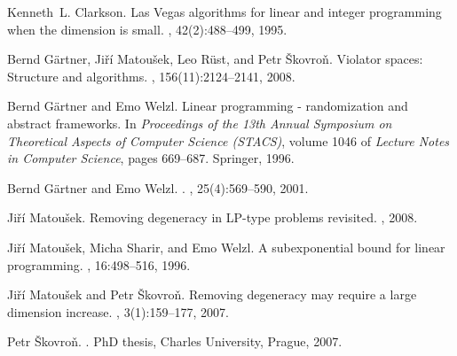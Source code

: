 \documentclass[12pt]{article}
\theoremstyle{remark}
\begin{document}
\newpage

\begin{thebibliography}{1}

Kenneth~L. Clarkson.
\newblock Las {V}egas algorithms for linear and integer programming when the
  dimension is small.
, 42(2):488--499, 1995.

Bernd G{\"a}rtner, Ji{\v{r}}{\'{i}} Matou{\v{s}}ek, Leo R{\"u}st, and Petr
  {\v{S}}kovro{\v{n}}.
\newblock Violator spaces: Structure and algorithms.
, 156(11):2124--2141, 2008.

Bernd G{\"a}rtner and Emo Welzl.
\newblock Linear programming - randomization and abstract frameworks.
\newblock In {\em Proceedings of the 13th Annual Symposium on Theoretical
  Aspects of Computer Science ({STACS})}, volume 1046 of {\em Lecture Notes in
  Computer Science}, pages 669--687. Springer, 1996.

Bernd G{\"a}rtner and Emo Welzl.
.
, 25(4):569--590, 2001.

Ji{\v{r}}{\'{i}} Matou{\v{s}}ek.
\newblock Removing degeneracy in {LP}-type problems revisited.
, 2008.

Ji{\v{r}}{\'{i}} Matou{\v{s}}ek, Micha Sharir, and Emo Welzl.
\newblock A subexponential bound for linear programming.
, 16:498--516, 1996.

Ji{\v{r}}{\'{i}} Matou{\v{s}}ek and Petr {\v{S}}kovro{\v{n}}.
\newblock Removing degeneracy may require a large dimension increase.
, 3(1):159--177, 2007.

Petr {\v{S}}kovro{\v{n}}.
.
\newblock PhD thesis, Charles University, Prague, 2007.

\end{thebibliography}
\end{document}
